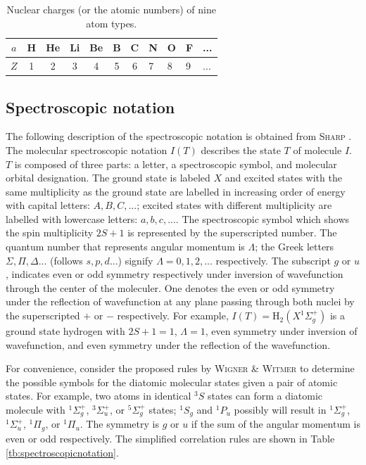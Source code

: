 \documentclass[12pt]{article}
\begin{document}
\begin{table}[htb]
    \centering
    \caption{Nuclear charges (or the atomic numbers) of nine atom types.}
    \label{tb:nuclearcharge}
    \begin{tabular}{|c|ccccccllll|}
        \hline
        \textbf{$a$}   & H & He & Li & Be & B & C & N & O & F & ... \\ \hline
        \textbf{$Z$} & 1 & 2  & 3  & 4  & 5 & 6 & 7 & 8 & 9 & ... \\ \hline
    \end{tabular}
\end{table}

\subsection{Spectroscopic notation}
The following description of the spectroscopic notation is obtained from \textsc{Sharp} \cite{idx172}. The molecular spectroscopic notation $I(T)$ describes the state $T$ of molecule $I$. $T$ is composed of three parts: a letter, a spectroscopic symbol, and molecular orbital designation. The ground state is labeled $X$ and excited states with the same multiplicity as the ground state are labelled in increasing order of energy with capital letters: $A, B, C, ...$; excited states with different multiplicity are labelled with lowercase letters: $a, b, c,...$. The spectroscopic symbol which shows the spin multiplicity $2S+1$ is represented by the superscripted number. The quantum number that represents angular momentum is $\Lambda$; the Greek letters $\Sigma, \Pi, \Delta... $ (follows $s, p, d...$) signify $\Lambda = 0, 1, 2, ...$ respectively. The subscript $g$ or $u$, indicates even or odd symmetry respectively under inversion of wavefunction through the center of the moleculer. One denotes the even or odd symmetry under the reflection of wavefunction at any plane passing through both nuclei by the superscripted $+$ or $-$ respectively. For example, $I(T) = \text{H}_2(X^1\Sigma_g^+)$ is a ground state hydrogen with $2S+1 = 1$, $\Lambda = 1$, even symmetry under inversion of wavefunction, and even symmetry under the reflection of the wavefunction.

For convenience, consider the proposed rules by \textsc{Wigner \& Witmer} \cite{idx175} to determine the possible symbols for the diatomic molecular states given a pair of atomic states. 
For example, two atoms in identical 
$^3S$ states can form a diatomic molecule with $^1\Sigma_g^+$, 
$^3\Sigma_u^+$, or 
$^5\Sigma_g^+$ states; 
$^1S_g$ and 
$^1P_u$ possibly will result in 
$^1\Sigma_g^+$, 
$^1\Sigma_u^+$, 
$^1\Pi_g$, or 
$^1\Pi_u$. 
The symmetry is $g$ or $u$ if the sum of the angular momentum is even or odd respectively. The simplified correlation rules are shown in Table \ref{tb:spectroscopicnotation}.
\end{document}
